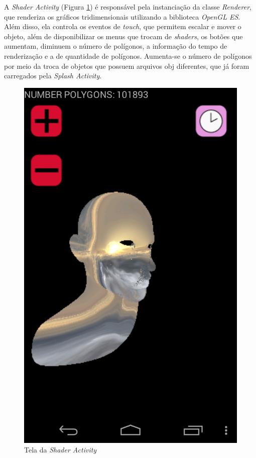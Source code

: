 	A \textit{Shader Activity} (Figura  \ref{shader_act}) é responsável pela  instanciação da classe \textit{Renderer}, que renderiza os gráficos tridimensionais utilizando a biblioteca \textit{OpenGL ES}. Além disso, ela controla os eventos de \textit{touch}, que permitem escalar e mover o objeto, além de disponibilizar os menus que trocam de \textit{shaders}, os botões que aumentam, diminuem o número de polígonos, a informação do tempo de renderização e a de quantidade de polígonos. Aumenta-se o número de polígonos por meio da troca de objetos que possuem arquivos obj diferentes, que já foram carregados pela \textit{Splash Activity}. 

	\begin{figure}[h]
	\centering
		\includegraphics[keepaspectratio=true,scale=0.2]{figuras/shader_act.png}
	\caption{Tela da \textit{Shader Activity}}
	\label{shader_act}
	\end{figure}

